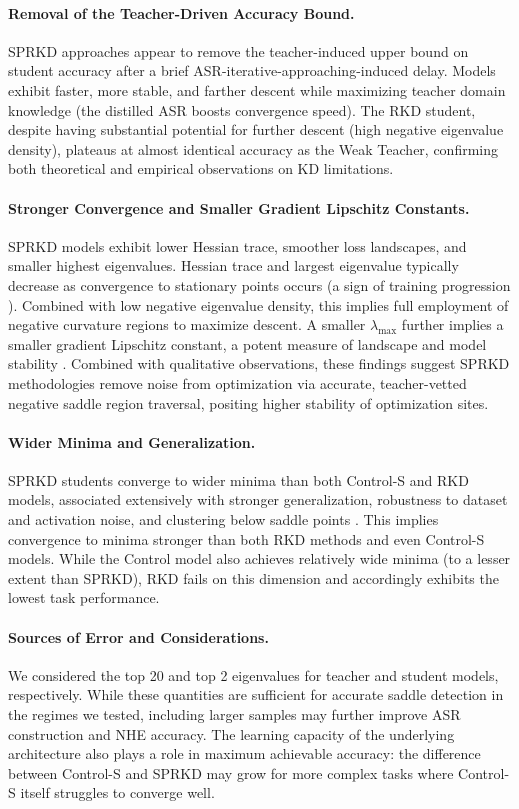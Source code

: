 \documentclass[letterpaper]{article}
\begin{document}
\paragraph{Removal of the Teacher-Driven Accuracy Bound.}
SPRKD approaches appear to remove the teacher-induced upper bound on student accuracy after a brief ASR-iterative-approaching-induced delay. Models exhibit faster, more stable, and farther descent while maximizing teacher domain knowledge (the distilled ASR boosts convergence speed). The RKD student, despite having substantial potential for further descent (high negative eigenvalue density), plateaus at almost identical accuracy as the Weak Teacher, confirming both theoretical and empirical observations on KD limitations.

\paragraph{Stronger Convergence and Smaller Gradient Lipschitz Constants.}
SPRKD models exhibit lower Hessian trace, smoother loss landscapes, and smaller highest eigenvalues. Hessian trace and largest eigenvalue typically decrease as convergence to stationary points occurs (a sign of training progression \citep{alain2019negative}). Combined with low negative eigenvalue density, this implies full employment of negative curvature regions to maximize descent. A smaller $\lambda_{\max}$ further implies a smaller gradient Lipschitz constant, a potent measure of landscape and model stability \citep{hardt2016train}. Combined with qualitative observations, these findings suggest SPRKD methodologies remove noise from optimization via accurate, teacher-vetted negative saddle region traversal, positing higher stability of optimization sites.

\paragraph{Wider Minima and Generalization.}
SPRKD students converge to wider minima than both Control-S and RKD models, associated extensively with stronger generalization, robustness to dataset and activation noise, and clustering below saddle points \citep{chaudhari2019entropy}. This implies convergence to minima stronger than both RKD methods and even Control-S models. While the Control model also achieves relatively wide minima (to a lesser extent than SPRKD), RKD fails on this dimension and accordingly exhibits the lowest task performance.

\paragraph{Sources of Error and Considerations.}
We considered the top 20 and top 2 eigenvalues for teacher and student models, respectively. While these quantities are sufficient for accurate saddle detection in the regimes we tested, including larger samples may further improve ASR construction and NHE accuracy. The learning capacity of the underlying architecture also plays a role in maximum achievable accuracy: the difference between Control-S and SPRKD may grow for more complex tasks where Control-S itself struggles to converge well.
\end{document}
